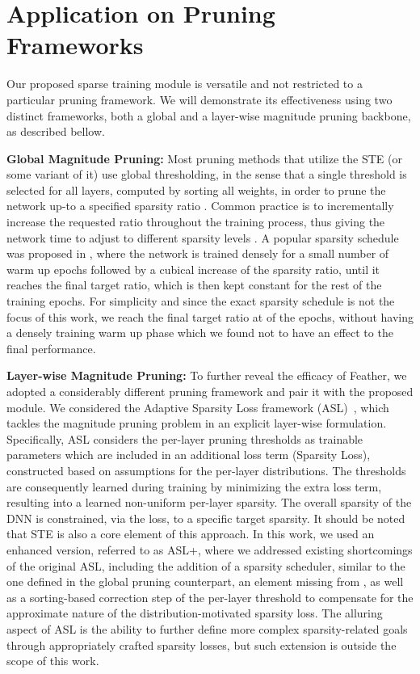 \documentclass{article}
\begin{document}
\section{Application on Pruning Frameworks}
\label{sec:frameworks}

Our proposed sparse training module is versatile and not restricted to a particular pruning framework. We will demonstrate its effectiveness using two distinct frameworks, both a global and a layer-wise magnitude pruning backbone, as described bellow.

\hfill \break
\noindent \textbf{Global Magnitude Pruning:} Most pruning methods that utilize the STE (or some variant of it) use  global thresholding, in the sense that a single threshold  is selected for all layers, computed by sorting all weights, in order to prune the network up-to a specified sparsity ratio \cite{jayakumar2020top, vanderschueren2023straight, tai2022spartan}. Common practice is to incrementally increase the requested ratio throughout the training process, thus giving the network time to adjust to different sparsity levels \cite{zhu2017prune,kusupati2020soft}. A popular sparsity schedule was proposed in \cite{zhu2017prune}, where the network is trained densely for a small number of warm up epochs followed by a cubical increase of the sparsity ratio, until it reaches the final target ratio, which is then kept constant for the rest of the training epochs. For simplicity and since the exact sparsity schedule is not the focus of this work, we reach the final target ratio at  of the epochs, without having a densely training warm up phase which we found not to have an effect to the final performance. 

\hfill \break
\noindent \textbf{Layer-wise Magnitude Pruning:} 
To further reveal the efficacy of Feather, we adopted a considerably different pruning framework and pair it with the proposed module.
We considered the Adaptive Sparsity Loss framework (ASL)~\cite{retsinas2021online}, which tackles the magnitude pruning problem in an explicit layer-wise formulation. Specifically, ASL considers the per-layer pruning thresholds as trainable parameters which are included in an additional loss term (Sparsity Loss), constructed based on assumptions for the per-layer distributions. The thresholds are consequently learned during training by minimizing the extra loss term, resulting into a learned non-uniform per-layer sparsity. The overall sparsity of the DNN is constrained, via the loss, to a specific target sparsity. 
It should be noted that STE is also a core element of this approach. In this work, we used an enhanced version, referred to as ASL+, where we addressed existing shortcomings of the original ASL, including the addition of a sparsity scheduler, similar to the one defined in the global pruning counterpart, an element missing from \cite{retsinas2021online}, as well as a sorting-based correction step of the per-layer threshold to compensate for the approximate nature of the distribution-motivated sparsity loss. The alluring aspect of ASL is the ability to further define more complex sparsity-related goals through appropriately crafted sparsity losses, but such extension is outside the scope of this work.  
\end{document}
